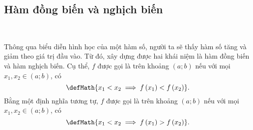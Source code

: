 \subsection{Hàm đồng biến và nghịch biến}

\ %

Thông qua biểu diễn hình học của một hàm số, người ta sẽ thấy hàm số tăng và giảm theo giá trị đầu vào. Từ đó, xây dựng được hai khái niệm là hàm đồng biến và hàm nghịch biến. Cụ thể, $f$ được gọi là  trên khoảng $\left(a; b\right)$ nếu với mọi $x_1, x_2 \in \left(a; b\right)$, có $$\defMath{x_1 < x_2 \implies f\left(x_1\right) < f\left(x_2\right)}.$$ Bằng một định nghĩa tương tự, $f$ được gọi là  trên khoảng $\left(a; b\right)$ nếu với mọi $x_1, x_2 \in \left(a; b\right)$, có $$\defMath{x_1 < x_2 \implies f\left(x_1\right) > f\left(x_2\right)}.$$ 

